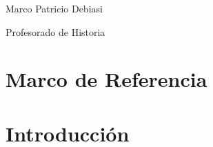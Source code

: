 \documentclass[a4paper,13pt,titlepage,oneside]{article}
\begin{document}
	\begin{titlepage}
	\vspace{1.5cm}


	\fontsize{22pt}{20pt}\selectfont Marco Patricio Debiasi\par
	\vspace{1cm}
	\fontsize{22pt}{10pt}\selectfont Profesorado de Historia\par
	\end{titlepage}


\newpage

\section{Marco de Referencia}

\newpage

\section{Introducción}

\newpage
\end{document}
